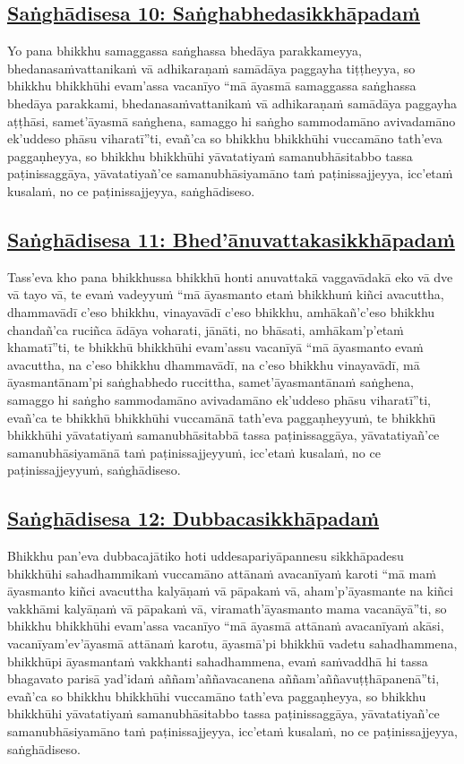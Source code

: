 \subsection*{\hyperref[comm10]{Saṅghādisesa 10: Saṅghabhedasikkhāpadaṁ}}
\label{sd10}
Yo pana bhikkhu samaggassa saṅghassa bhedāya parakkameyya, bhedanasaṁvattanikaṁ vā adhikaraṇaṁ samādāya paggayha tiṭṭheyya, so bhikkhu bhikkhūhi evam'assa vacanīyo “mā āyasmā samaggassa saṅghassa bhedāya parakkami, bhedanasaṁvattanikaṁ vā adhikaraṇaṁ samādāya paggayha aṭṭhāsi, samet'āyasmā saṅghena, samaggo hi saṅgho sammodamāno avivadamāno ek'uddeso phāsu viharatī”ti, evañ'ca so bhikkhu bhikkhūhi vuccamāno tath'eva paggaṇheyya, so bhikkhu bhikkhūhi yāvatatiyaṁ samanubhāsitabbo tassa paṭinissaggāya, yāvatatiyañ'ce samanubhāsiyamāno taṁ paṭinissajjeyya, icc'etaṁ kusalaṁ, no ce paṭinissajjeyya, saṅghādiseso.

\subsection*{\hyperref[comm11]{Saṅghādisesa 11: Bhed'ānuvattakasikkhāpadaṁ}}
\label{sd11}
Tass'eva kho pana bhikkhussa bhikkhū honti anuvattakā vaggavādakā eko vā dve vā tayo vā, te evaṁ vadeyyuṁ “mā āyasmanto etaṁ bhikkhuṁ kiñci avacuttha, dhammavādī c'eso bhikkhu, vinayavādī c'eso bhikkhu, amhākañ'c'eso bhikkhu chandañ'ca ruciñca ādāya voharati, jānāti, no bhāsati, amhākam'p'etaṁ khamatī”ti, te bhikkhū bhikkhūhi evam'assu vacanīyā “mā āyasmanto evaṁ avacuttha, na c'eso bhikkhu dhammavādī, na c'eso bhikkhu vinayavādī, mā āyasmantānam'pi saṅghabhedo ruccittha, samet'āyasmantānaṁ saṅghena, samaggo hi saṅgho sammodamāno avivadamāno ek'uddeso phāsu viharatī”ti, evañ'ca te bhikkhū bhikkhūhi vuccamānā tath'eva paggaṇheyyuṁ, te bhikkhū bhikkhūhi yāvatatiyaṁ samanubhāsitabbā tassa paṭinissaggāya, yāvatatiyañ'ce samanubhāsiyamānā taṁ paṭinissajjeyyuṁ, icc'etaṁ kusalaṁ, no ce paṭinissajjeyyuṁ, saṅghādiseso.

\subsection*{\hyperref[comm12]{Saṅghādisesa 12: Dubbacasikkhāpadaṁ}}
\label{sd12}
Bhikkhu pan'eva dubbacajātiko hoti uddesapariyāpannesu sikkhāpadesu bhikkhūhi sahadhammikaṁ vuccamāno attānaṁ avacanīyaṁ karoti “mā maṁ āyasmanto kiñci avacuttha kalyāṇaṁ vā pāpakaṁ vā, aham'p'āyasmante na kiñci vakkhāmi kalyāṇaṁ vā pāpakaṁ vā, viramath'āyasmanto mama vacanāyā”ti, so bhikkhu bhikkhūhi evam'assa vacanīyo “mā āyasmā attānaṁ avacanīyaṁ akāsi, vacanīyam'ev'āyasmā attānaṁ karotu, āyasmā'pi bhikkhū vadetu sahadhammena, bhikkhūpi āyasmantaṁ vakkhanti sahadhammena, evaṁ saṁvaddhā hi tassa bhagavato parisā yad'idaṁ aññam'aññavacanena aññam'aññavuṭṭhāpanenā”ti, evañ'ca so bhikkhu bhikkhūhi vuccamāno tath'eva paggaṇheyya, so bhikkhu bhikkhūhi yāvatatiyaṁ samanubhāsitabbo tassa paṭinissaggāya, yāvatatiyañ'ce samanubhāsiyamāno taṁ paṭinissajjeyya, icc'etaṁ kusalaṁ, no ce paṭinissajjeyya, saṅghādiseso.

